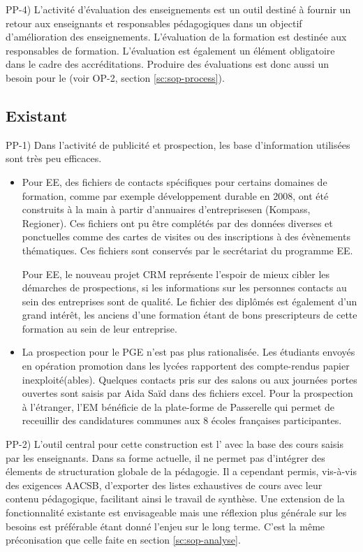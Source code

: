 \documentclass{book}
\begin{document}
PP-4) L'activité d'évaluation des enseignements est un outil destiné à fournir un 
retour aux enseignants et responsables pédagogiques dans un objectif d'amélioration
des enseignements. L'évaluation de la formation est destinée aux responsables de
formation.
L'évaluation est également  un élément obligatoire dans le cadre des accréditations. 
Produire des évaluations est donc aussi un besoin pour le \sop (voir OP-2, 
section \ref{sc:sop-process}). 


\subsection{Existant}

PP-1) Dans l'activité de publicité et prospection, les base d'information 
utilisées sont très peu efficaces. 
\begin{itemize}
\item Pour EE, des fichiers de contacts spécifiques 
pour certains domaines de formation, comme par exemple développement durable en
2008, ont été construits à la main à partir d'annuaires d'entreprisesen (Kompass, 
Regioner). Ces fichiers ont pu être complétés par des données diverses et ponctuelles
comme des cartes de visites ou des inscriptions à des évènements thématiques.
Ces fichiers sont conservés par le secrétariat du programme EE.

Pour EE, le nouveau projet CRM représente l'espoir de mieux cibler les
démarches de prospections, si les informations sur les personnes contacts au sein 
des entreprises sont de qualité. Le fichier des diplômés est également d'un 
grand intérêt, les anciens d'une formation étant de bons prescripteurs de cette 
formation au sein de leur entreprise.

\item
La prospection pour le PGE n'est pas plus rationalisée. Les étudiants envoyés
en opération promotion dans les lycées rapportent des compte-rendus papier
inexploité(ables). Quelques contacts pris sur des salons ou aux journées portes
ouvertes sont saisis par Aida Saïd dans des fichiers excel. Pour la prospection
à l'étranger, l'EM bénéficie de la plate-forme  de Passerelle
qui permet de receuillir des candidatures communes aux 8 écoles françaises 
participantes. \\
\end{itemize}


PP-2) L'outil central pour cette construction est l' avec 
la base des cours saisis par les enseignants. Dans sa forme actuelle, il 
ne permet pas d'intégrer des élements de structuration globale de la pédagogie. 
Il a cependant permis, vis-à-vis des exigences AACSB, d'exporter des listes 
exhaustives de cours avec leur contenu pédagogique, facilitant ainsi le
travail de synthèse. Une extension de la fonctionnalité existante est 
envisageable mais une réflexion plus générale sur les besoins est préférable 
étant donné l'enjeu sur le long terme. C'est la même préconisation que celle 
faite en section \ref{sc:sop-analyse}.
\end{document}
